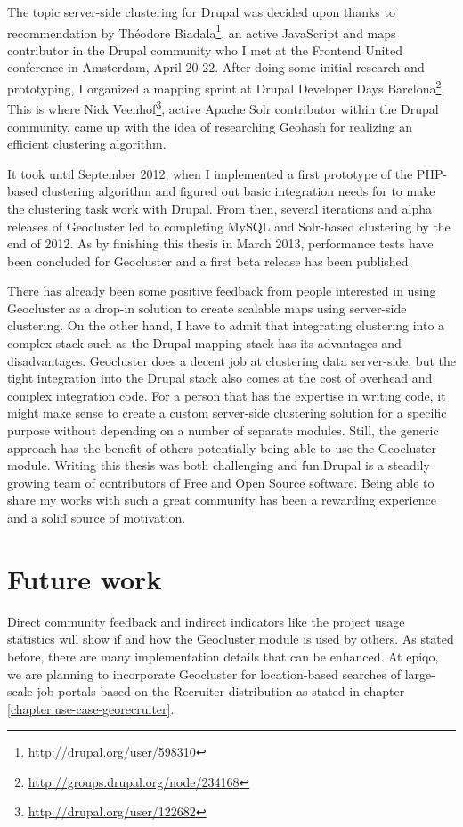 The topic server-side clustering for Drupal was decided upon thanks to recommendation by Th\'eodore Biadala\footnote{\url{http://drupal.org/user/598310}}, an active JavaScript and maps contributor in the Drupal community who I met at the Frontend United conference in Amsterdam, April 20-22. After doing some initial research and prototyping, I organized a mapping sprint at Drupal Developer Days Barclona\footnote{\url{http://groups.drupal.org/node/234168}}. This is where Nick Veenhof\footnote{\url{http://drupal.org/user/122682}}, active Apache Solr contributor within the Drupal community, came up with the idea of researching Geohash for realizing an efficient clustering algorithm.

It took until September 2012, when I implemented a first prototype of the PHP-based clustering algorithm and figured out basic integration needs for to make the clustering task work with Drupal. From then, several iterations and alpha releases of Geocluster led to completing MySQL and Solr-based clustering by the end of 2012. As by finishing this thesis in March 2013, performance tests have been concluded for Geocluster and a first beta release has been published.

There has already been some positive feedback from people interested in using Geocluster as a drop-in solution to create scalable maps using server-side clustering. On the other hand, I have to admit that integrating clustering into a complex stack such as the Drupal mapping stack has its advantages and disadvantages. Geocluster does a decent job at clustering data server-side, but the tight integration into the Drupal stack also comes at the cost of overhead and complex integration code. For a person that has the expertise in writing code, it might make sense to create a custom server-side clustering solution for a specific purpose without depending on a number of separate modules. Still, the generic approach has the benefit of others potentially being able to use the Geocluster module. Writing this thesis was both challenging and fun.Drupal is a steadily growing team of contributors of Free and Open Source software. Being able to share my works with such a great community has been a rewarding experience and a solid source of motivation. 

\section{Future work}

Direct community feedback and indirect indicators like the project usage statistics will show if and how the Geocluster module is used by others. As stated before, there are many implementation details that can be enhanced. At epiqo, we are planning to incorporate Geocluster for location-based searches of large-scale job portals based on the Recruiter distribution as stated in chapter \ref{chapter:use-case-georecruiter}. 
